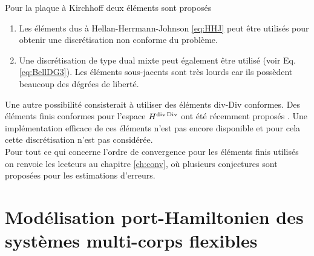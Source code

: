 Pour la plaque à Kirchhoff deux éléments sont proposés
\begin{enumerate}
	\item Les éléments dus à Hellan-Herrmann-Johnson \eqref{eq:HHJ} \cite{hellan1967,herrmann1967finite,johnson1973convergence} peut être utilisés pour obtenir une discrétisation non conforme du problème.
	\item Une discrétisation de type dual mixte peut également être utilisé (voir Eq. \eqref{eq:BellDG3}). Les éléments sous-jacents sont très lourds car ils possèdent beaucoup des dégrées de liberté.
\end{enumerate}

Une autre possibilité consisterait à utiliser des éléments div-Div conformes. Des éléments finis conformes pour l'espace $ H^{\operatorname{div}\operatorname*{Div}} $ ont été récemment proposés \cite{chen2020divDiv}. Une implémentation efficace de ces éléments n'est pas encore disponible et pour cela cette discrétisation n'est pas considérée. \\

Pour tout ce qui  concerne l'ordre de convergence pour les éléments finis utilisés on renvoie les lecteurs au chapitre \ref{ch:conv}, où plusieurs conjectures sont proposées pour les estimations d'erreurs.


\section{Modélisation port-Hamiltonien des systèmes multi-corps flexibles}

